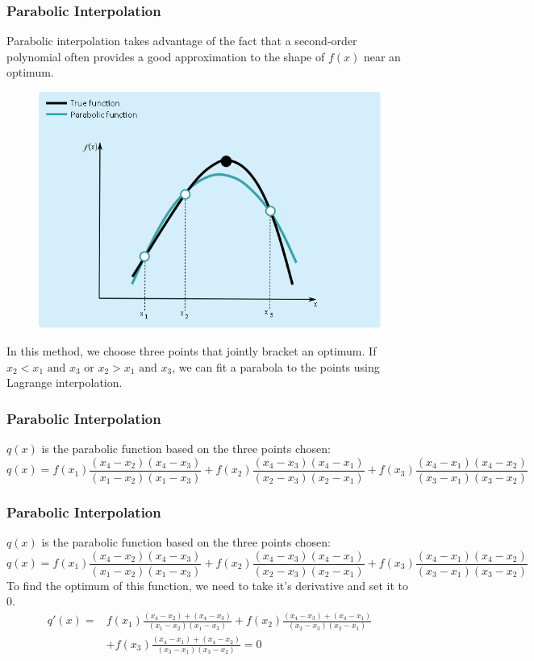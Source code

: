 \documentclass{if-beamer}
\begin{document}
\begin{frame}
	\frametitle{Parabolic Interpolation}
	Parabolic interpolation takes advantage of the fact that a second-order polynomial often
	provides a good approximation to the shape of $f(x)$ near an optimum.
	\begin{figure}
		\centering
		\includegraphics[width = .5\textwidth]{figures/para3}
	\end{figure} 
	In this method, we choose three points that jointly bracket an optimum. If $x_2 < x_1 \textrm{ and } x_3$ or $x_2 > x_1 \textrm{ and } x_3$, we can fit a parabola to the points using Lagrange interpolation. 
\end{frame}

\begin{frame}[t]
	\frametitle{Parabolic Interpolation}
	$q(x)$ is the parabolic function based on the three points chosen:
	$$q(x) = f(x_1)\frac{(x_4-x_2)(x_4-x_3)}{(x_1-x_2)(x_1-x_3)}+f(x_2)\frac{(x_4-x_3)(x_4-x_1)}{(x_2-x_3)(x_2-x_1)}+f(x_3)\frac{(x_4-x_1)(x_4-x_2)}{(x_3-x_1)(x_3-x_2)} $$
\end{frame}

\begin{frame}[t]
	\frametitle{Parabolic Interpolation}
	$q(x)$ is the parabolic function based on the three points chosen:
	$$q(x) = f(x_1)\frac{(x_4-x_2)(x_4-x_3)}{(x_1-x_2)(x_1-x_3)}+f(x_2)\frac{(x_4-x_3)(x_4-x_1)}{(x_2-x_3)(x_2-x_1)}+f(x_3)\frac{(x_4-x_1)(x_4-x_2)}{(x_3-x_1)(x_3-x_2)} $$
	To find the optimum of this function, we need to take it's derivative and set it to 0.
	\begin{align*}
	q'(x) = & f(x_1)\frac{(x_4-x_2)+(x_4-x_3)}{(x_1-x_2)(x_1-x_3)}+f(x_2)\frac{(x_4-x_3)+(x_4-x_1)}{(x_2-x_3)(x_2-x_1)}\\
	&+f(x_3)\frac{(x_4-x_1)+(x_4-x_2)}{(x_3-x_1)(x_3-x_2)} = 0
	\end{align*}
\end{frame}
\end{document}
